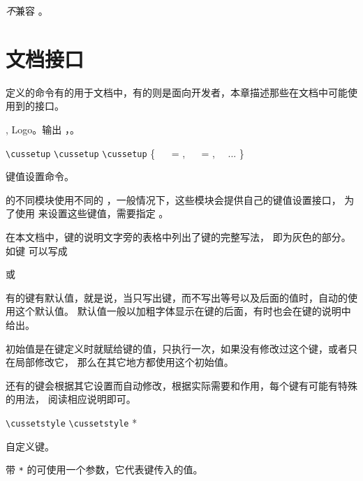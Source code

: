 \documentclass{cusdoc}
\begin{document}
\emph{不}兼容 。

\chapter{文档接口}

\CusTeX 定义的命令有的用于文档中，有的则是面向开发者，本章描述那些在文档中可能使用到的接口。

\begin{function}{\CusTeX,\CusLaTeX}
Logo。输出 \CusTeX，\CusLaTeX。
\end{function}

\begin{function}{\cussetup}
\begin{syntax}
  \verb|\cussetup| 
  \verb|\cussetup|  
  \verb|\cussetup| \{
  ~~ =  ,
  ~~ =  ,
  ~~...
  \}
\end{syntax}
键值设置命令。

\CusTeX 的不同模块使用不同的 ，一般情况下，这些模块会提供自己的键值设置接口，
为了使用  来设置这些键值，需要指定 。
\end{function}

在本文档中，键的说明文字旁的表格中列出了键的完整写法， 即为灰色的部分。
如键  可以写成 
\begin{xample}
或 
\stopxamplecode
\xamplecode\medskip
\end{xample}
有的键有默认值，就是说，当只写出键，而不写出等号以及后面的值时，自动的使用这个默认值。
默认值一般以加粗字体显示在键的后面，有时也会在键的说明中给出。

初始值是在键定义时就赋给键的值，只执行一次，如果没有修改过这个键，或者只在局部修改它，
那么在其它地方都使用这个初始值。

还有的键会根据其它设置而自动修改，根据实际需要和作用，每个键有可能有特殊的用法，
阅读相应说明即可。

\begin{function}{\cussetstyle}
\begin{syntax}
  \verb|\cussetstyle|     
  \verb|\cussetstyle| *   
\end{syntax}
自定义键。

带 \verb|*| 的可使用一个参数，它代表键传入的值。
\end{function}
\end{document}
